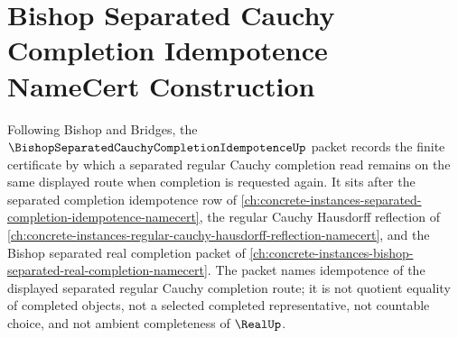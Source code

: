 \chapter{Bishop Separated Cauchy Completion Idempotence NameCert Construction}
\label{ch:concrete-instances-bishop-separated-cauchy-completion-idempotence-namecert}

Following Bishop and Bridges, the $\BishopSeparatedCauchyCompletionIdempotenceUp$ packet records the finite certificate by which a separated regular Cauchy completion read remains on the same displayed route when completion is requested again. It sits after the separated completion idempotence row of \autoref{ch:concrete-instances-separated-completion-idempotence-namecert}, the regular Cauchy Hausdorff reflection of \autoref{ch:concrete-instances-regular-cauchy-hausdorff-reflection-namecert}, and the Bishop separated real completion packet of \autoref{ch:concrete-instances-bishop-separated-real-completion-namecert}. The packet names idempotence of the displayed separated regular Cauchy completion route; it is not quotient equality of completed objects, not a selected completed representative, not countable choice, and not ambient completeness of $\RealUp$.

